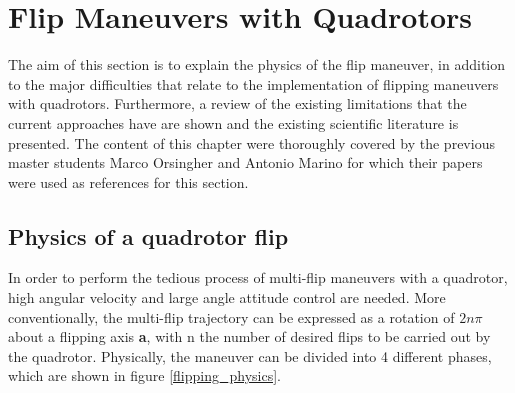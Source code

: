 \documentclass{thesisreport}
\begin{document}
 
\newpage

\section{Flip Maneuvers with Quadrotors}


The aim of this section is to explain the physics of the flip maneuver, in addition to the major difficulties that relate to the implementation of flipping maneuvers with quadrotors. Furthermore, a review of the existing limitations that the current approaches have are shown and the existing scientific literature is presented. The content of this chapter were thoroughly covered by the previous master students Marco Orsingher \cite{Orsingher2019} and Antonio Marino \cite{Marino2020} for which their papers were used as references for this section.  

\subsection{Physics of a quadrotor flip}\label{multiflip_physics}


In order to perform the tedious process of multi-flip maneuvers with a quadrotor, high angular velocity and large angle attitude control are needed. More conventionally, the multi-flip trajectory can be expressed as a rotation of $2n \pi$ about a flipping axis \textbf{a}, with n the number of desired flips to be carried out by the quadrotor. Physically, the maneuver can be divided into 4 different phases, which are shown in figure \ref{flipping_physics}.
\end{document}
